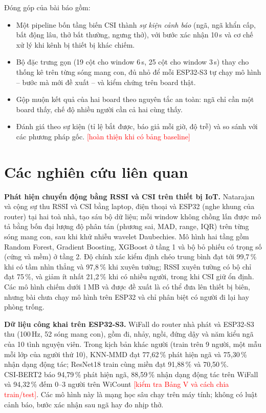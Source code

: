 \documentclass[conference]{IEEEtran}
\newcommand{\canlam}[1]{\textcolor{red}{[#1]}}
\begin{document}
Đóng góp của bài báo gồm:
\begin{itemize}
  \item Một pipeline bốn tầng biến CSI thành \emph{sự kiện cảnh báo} (ngã, ngã khẩn cấp, bất động lâu, thở bất thường,
    ngưng thở), với bước xác nhận 10\,s và cơ chế xử lý khi kênh bị thiết bị khác chiếm.
  \item Bộ đặc trưng gọn (19 cột cho window 6\,s, 25 cột cho window 3\,s) thay cho thống kê trên từng sóng mang con,
    đủ nhỏ để mỗi ESP32‑S3 tự chạy mô hình – bước mà \cite{natarajan2023} mới đề xuất – và kiểm chứng trên board
    thật.
  \item Gộp muộn kết quả của hai board theo nguyên tắc an toàn: ngã chỉ cần một board thấy, chế độ nhiều người cần cả
    hai cùng thấy.
  \item Đánh giá theo sự kiện (tỉ lệ bắt được, báo giả mỗi giờ, độ trễ) và so sánh với các phương pháp gốc.
    \canlam{hoàn thiện khi có bảng baseline}
\end{itemize}

\section{Các nghiên cứu liên quan}
\textbf{Phát hiện chuyển động bằng RSSI và CSI trên thiết bị IoT.} Natarajan và cộng sự \cite{natarajan2023} thu RSSI
và CSI bằng laptop, điện thoại và ESP32 (nghe khung của router) tại hai toà nhà, tạo sáu bộ dữ liệu; mỗi window không
chồng lấn được mô tả bằng bốn đại lượng độ phân tán (phương sai, MAD, range, IQR) trên từng sóng mang con, sau khi khử
nhiễu wavelet Daubechies. Mô hình hai tầng gồm Random Forest, Gradient Boosting, XGBoost ở tầng 1 và bộ bỏ phiếu có
trọng số (cứng và mềm) ở tầng 2. Độ chính xác kiểm định chéo trung bình đạt tới 99,7\,\% khi có tầm nhìn thẳng và
97,8\,\% khi xuyên tường; RSSI xuyên tường có bộ chỉ đạt 75\,\%, và giảm ít nhất 21,2\,\% khi có nhiều người, trong khi
CSI giữ ổn định. Các mô hình chiếm dưới 1\,MB và được đề xuất là có thể đưa lên thiết bị biên, nhưng bài chưa chạy mô
hình trên ESP32 và chỉ phân biệt có người đi lại hay phòng trống.

\textbf{Dữ liệu công khai trên ESP32‑S3.} WiFall \cite{wifall} do router nhà phát và ESP32‑S3 thu (100\,Hz, 52 sóng mang
con), gồm đi, nhảy, ngồi, đứng dậy và năm kiểu ngã của 10 tình nguyện viên. Trong kịch bản khác người (train trên 9
người, một mẫu mỗi lớp của người thứ 10), KNN‑MMD đạt 77,62\,\% phát hiện ngã và 75,30\,\% nhận dạng động tác; ResNet18
train cùng miền đạt 91,88\,\% và 70,50\,\%. CSI‑BERT2 \cite{csibert2} báo 94,79\,\% phát hiện ngã, 88,59\,\% nhận dạng
động tác trên WiFall và 94,32\,\% đếm 0–3 người trên WiCount \canlam{kiểm tra Bảng V và cách chia train/test}. Các mô
hình này là mạng học sâu chạy trên máy tính; không có luật cảnh báo, bước xác nhận sau ngã hay đo nhịp thở.
\end{document}
